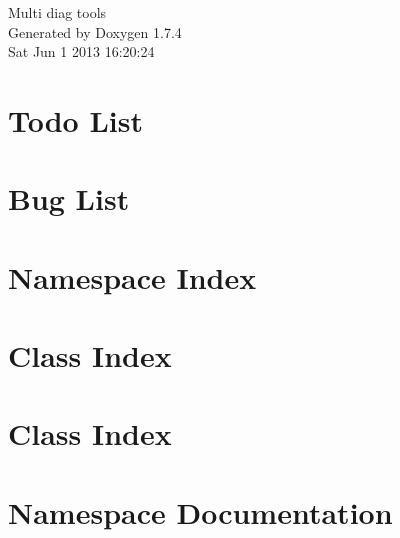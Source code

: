 \documentclass[a4paper]{book}
\begin{document}
\hypersetup{pageanchor=false}
\begin{titlepage}
\vspace*{7cm}
\begin{center}
{\Large Multi diag tools }\\
\vspace*{1cm}
{\large Generated by Doxygen 1.7.4}\\
\vspace*{0.5cm}
{\small Sat Jun 1 2013 16:20:24}\\
\end{center}
\end{titlepage}
\clearemptydoublepage
{}
\tableofcontents
\clearemptydoublepage
{}
\hypersetup{pageanchor=true}
\chapter{Todo List}
\label{todo}
\hypertarget{todo}{}

\chapter{Bug List}
\label{bug}
\hypertarget{bug}{}

\chapter{Namespace Index}

\chapter{Class Index}

\chapter{Class Index}

\chapter{Namespace Documentation}

\end{document}
